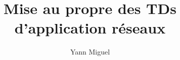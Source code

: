 \documentclass[10pt, a4paper]{article}
\title{Mise au propre des TDs d'application r\'eseaux}
\author{Yann Miguel}
\begin{document}
\ttfamily
\maketitle
\tableofcontents
\newpage





\end{document}
